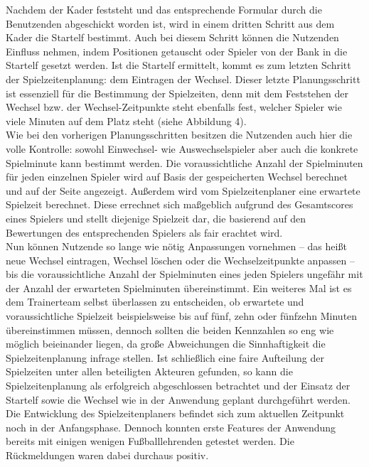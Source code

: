 Nachdem der Kader feststeht und das entsprechende Formular durch die Benutzenden 
abgeschickt worden ist, wird in einem dritten Schritt aus dem Kader die Startelf 
bestimmt. Auch bei diesem Schritt können die Nutzenden Einfluss nehmen, indem 
Positionen getauscht oder Spieler von der Bank in die Startelf gesetzt werden. Ist 
die Startelf ermittelt, kommt es zum letzten Schritt der Spielzeitenplanung: 
dem Eintragen der Wechsel. Dieser letzte Planungsschritt ist essenziell für die 
Bestimmung der Spielzeiten, denn mit dem Feststehen der Wechsel bzw. der 
Wechsel-Zeitpunkte steht ebenfalls fest, welcher Spieler wie viele Minuten auf dem 
Platz steht (siehe Abbildung 4). \\ 
Wie bei den vorherigen Planungsschritten besitzen die Nutzenden auch hier die volle 
Kontrolle: sowohl Einwechsel- wie Auswechselspieler aber auch die konkrete 
Spielminute kann bestimmt werden. Die voraussichtliche Anzahl der Spielminuten für 
jeden einzelnen Spieler wird auf Basis der gespeicherten Wechsel berechnet und auf 
der Seite angezeigt. Außerdem wird vom Spielzeitenplaner eine erwartete Spielzeit 
berechnet. Diese errechnet sich maßgeblich aufgrund des Gesamtscores eines Spielers 
und stellt diejenige Spielzeit dar, die basierend auf den Bewertungen des 
entsprechenden Spielers als fair erachtet wird. \\ 
Nun können Nutzende so lange wie nötig Anpassungen vornehmen -- das heißt neue 
Wechsel eintragen, Wechsel löschen oder die Wechselzeitpunkte anpassen -- bis 
die voraussichtliche Anzahl der Spielminuten eines jeden Spielers ungefähr mit der 
Anzahl der erwarteten Spielminuten übereinstimmt. Ein weiteres Mal ist es dem 
Trainerteam selbst überlassen zu entscheiden, ob erwartete und voraussichtliche 
Spielzeit beispielsweise bis auf fünf, zehn oder fünfzehn Minuten übereinstimmen 
müssen, dennoch sollten die beiden Kennzahlen so eng wie möglich beieinander 
liegen, da große Abweichungen die Sinnhaftigkeit die Spielzeitenplanung infrage 
stellen. Ist schließlich eine faire Aufteilung der Spielzeiten unter allen beteiligten 
Akteuren gefunden, so kann die Spielzeitenplanung als erfolgreich abgeschlossen 
betrachtet und der Einsatz der Startelf sowie die Wechsel wie in der Anwendung geplant 
durchgeführt werden. \\ 
Die Entwicklung des Spielzeitenplaners befindet sich zum aktuellen Zeitpunkt noch in 
der Anfangsphase. Dennoch konnten erste Features der Anwendung bereits mit einigen 
wenigen Fußballlehrenden getestet werden. Die Rückmeldungen waren dabei durchaus positiv. 
